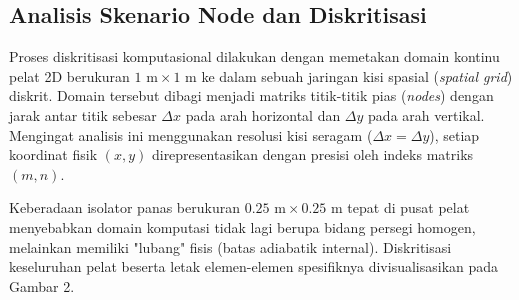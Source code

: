\documentclass[12pt,a4paper]{article}
\begin{document}
\subsection{Analisis Skenario Node dan Diskritisasi}
Proses diskritisasi komputasional dilakukan dengan memetakan domain kontinu pelat 2D berukuran $1\text{ m} \times 1\text{ m}$ ke dalam sebuah jaringan kisi spasial (\textit{spatial grid}) diskrit. Domain tersebut dibagi menjadi matriks titik-titik pias (\textit{nodes}) dengan jarak antar titik sebesar $\Delta x$ pada arah horizontal dan $\Delta y$ pada arah vertikal. Mengingat analisis ini menggunakan resolusi kisi seragam ($\Delta x = \Delta y$), setiap koordinat fisik $(x,y)$ direpresentasikan dengan presisi oleh indeks matriks $(m,n)$.

Keberadaan isolator panas berukuran $0.25\text{ m} \times 0.25\text{ m}$ tepat di pusat pelat menyebabkan domain komputasi tidak lagi berupa bidang persegi homogen, melainkan memiliki "lubang" fisis (batas adiabatik internal). Diskritisasi keseluruhan pelat beserta letak elemen-elemen spesifiknya divisualisasikan pada Gambar 2.
\end{document}
